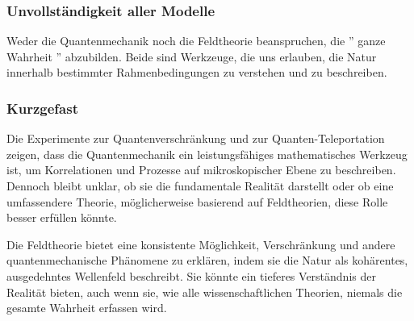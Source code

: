 \documentclass[12pt,a4paper]{article}
\begin{document}
	\subsubsection{Unvollständigkeit aller Modelle}
	Weder die Quantenmechanik noch die Feldtheorie beanspruchen, die '' ganze Wahrheit '' abzubilden. Beide sind Werkzeuge, die uns erlauben, die Natur innerhalb bestimmter Rahmenbedingungen zu verstehen und zu beschreiben.
	
	\subsubsection{Kurzgefast}
	Die Experimente zur Quantenverschränkung und zur Quanten-Teleportation zeigen, dass die Quantenmechanik ein leistungsfähiges mathematisches Werkzeug ist, um Korrelationen und Prozesse auf mikroskopischer Ebene zu beschreiben. Dennoch bleibt unklar, ob sie die fundamentale Realität darstellt oder ob eine umfassendere Theorie, möglicherweise basierend auf Feldtheorien, diese Rolle besser erfüllen könnte.
	
	Die Feldtheorie bietet eine konsistente Möglichkeit, Verschränkung und andere quantenmechanische Phänomene zu erklären, indem sie die Natur als kohärentes, ausgedehntes Wellenfeld beschreibt. Sie könnte ein tieferes Verständnis der Realität bieten, auch wenn sie, wie alle wissenschaftlichen Theorien, niemals die gesamte Wahrheit erfassen wird.
	
\end{document}
